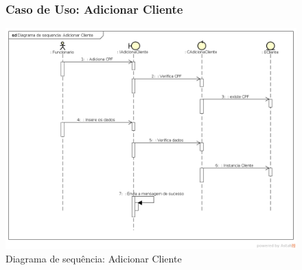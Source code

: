 \documentclass[
	12pt,				%
	openright,
	oneside,			%
	a4paper,			%
	chapter=TITLE,		%
	brazil				%
	]{abntex2}
\begin{document}
\begin{figure}[h!]

\subsubsection*{Caso de Uso: Adicionar Cliente}

	\caption{Diagrama de sequência: Adicionar Cliente}
	\begin{center}
	    \includegraphics[scale=0.5]{Arquivos/Analise/D_adicionar_cliente}  
	\end{center}
\end{figure}
\end{document}
